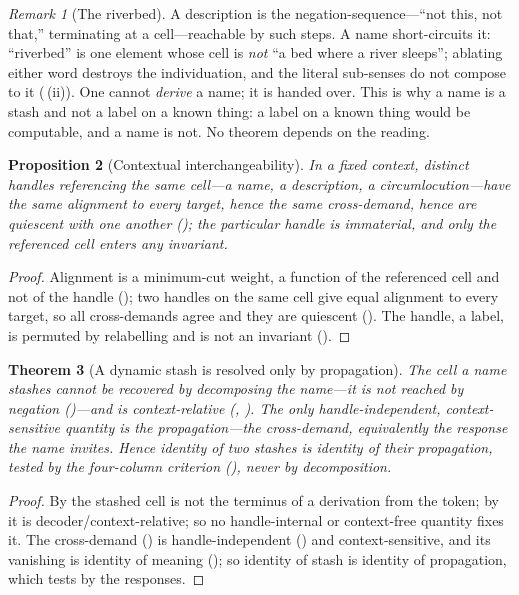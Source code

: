 \documentclass[twocolumn,11pt,a4paper]{article}
\theoremstyle{sup}
\newtheorem{theorem}{Theorem}[section]
\newtheorem{proposition}[theorem]{Proposition}
\theoremstyle{definition}
\theoremstyle{remark}
\newtheorem{remark}[theorem]{Remark}
\begin{document}
\begin{remark}[The riverbed]
\label{rem:riverbed}
A description is the negation-sequence---``not this, not that,'' terminating at a
cell---reachable by such steps. A name short-circuits it: ``riverbed'' is one
element whose cell is \emph{not} ``a bed where a river sleeps''; ablating either
word destroys the individuation, and the literal sub-senses do not compose to it
(\,(ii)). One cannot \emph{derive} a name; it is handed
over. This is why a name is a stash and not a label on a known thing: a label on
a known thing would be computable, and a name is not. No theorem depends on the
reading.
\end{remark}

\begin{proposition}[Contextual interchangeability]
\label{prop:interchange}
In a fixed context, distinct handles referencing the same cell---a name, a
description, a circumlocution---have the same alignment to every target, hence the
same cross-demand, hence are quiescent with one another ();
the particular handle is immaterial, and only the referenced cell enters any
invariant.
\end{proposition}

\begin{proof}
Alignment is a minimum-cut weight, a function of the referenced cell and not of
the handle (); two handles on the same cell give equal
alignment to every target, so all cross-demands agree and they are quiescent
(). The handle, a label, is permuted by relabelling and is
not an invariant ().
\end{proof}

\begin{theorem}[A dynamic stash is resolved only by propagation]
\label{thm:stash-propagation}
The cell a name stashes cannot be recovered by decomposing the name---it is not
reached by negation ()---and is context-relative
(, ). The only handle-independent,
context-sensitive quantity is the propagation---the cross-demand, equivalently the
response the name invites. Hence identity of two stashes is identity of their
propagation, tested by the four-column criterion (), never by
decomposition.
\end{theorem}

\begin{proof}
By  the stashed cell is not the terminus of a derivation
from the token; by  it is decoder/context-relative; so no
handle-internal or context-free quantity fixes it. The cross-demand
() is handle-independent () and
context-sensitive, and its vanishing is identity of meaning ();
so identity of stash is identity of propagation, which  tests by
the responses.
\end{proof}
\end{document}
